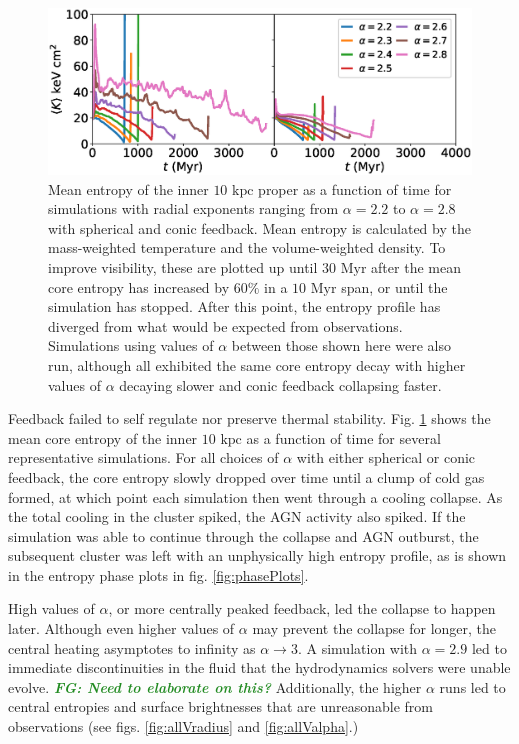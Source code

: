 \documentclass[iop,apjl, twocolappendix]{emulateapj}   %
\def\FG#1{{\textcolor{ForestGreen}{\textbf{\textit{ FG: #1}}}}}
\begin{document}
\begin{figure}
  \begin{center}
    \includegraphics[width=1\linewidth]{figures/avgCoreEntropies.eps}
  \end{center}
  \caption{
    \label{fig:avgCoreEntropies}
    Mean entropy of the inner $10 \text{ kpc}$ proper as a function of time for
    simulations with radial exponents ranging from $\alpha=2.2$ to $\alpha=2.8$
    with spherical and conic feedback.  Mean entropy is calculated by the
    mass-weighted temperature and the volume-weighted density. To improve
    visibility, these are plotted up until $30 \text{ Myr}$ after the mean core
    entropy has increased by $60\%$ in a $10 \text{ Myr}$ span, or until the
    simulation has stopped. After this point, the entropy profile has diverged
    from what would be expected from observations. Simulations using values of
    $\alpha$ between those shown here were also run, although all exhibited the
    same core entropy decay with higher values of $\alpha$ decaying slower and
    conic feedback collapsing faster.
  }
\end{figure}

Feedback failed to self regulate nor preserve thermal stability.
Fig. \ref{fig:avgCoreEntropies} shows the mean core entropy of the inner $10
\text{ kpc}$ as a function of time for several representative simulations. For
all choices of $\alpha$ with either spherical or conic feedback, the core
entropy slowly dropped over time until a clump of cold gas formed, at which
point each simulation then went through a cooling collapse. As the total
cooling in the cluster spiked, the AGN activity also spiked. If the simulation
was able to continue through the collapse and AGN outburst, the subsequent
cluster was left with an unphysically high entropy profile, as is shown in the
entropy phase plots in fig. \ref{fig:phasePlots}.

High values of $\alpha$, or more centrally peaked feedback, led the collapse to
happen later. Although even higher values of $\alpha$ may prevent the collapse
for longer, the central heating asymptotes to infinity as $\alpha \rightarrow
3$. A simulation with $\alpha=2.9$ led to immediate discontinuities in the
fluid that the hydrodynamics solvers were unable evolve. \FG{Need to elaborate
on this?} Additionally, the higher $\alpha$ runs led to central entropies and
surface brightnesses that are unreasonable from observations (see figs.
\ref{fig:allVradius} and \ref{fig:allValpha}.)
\end{document}
